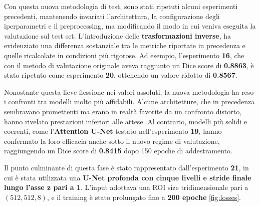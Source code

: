 
Con questa nuova metodologia di test, sono stati ripetuti alcuni esperimenti precedenti, mantenendo invariati l’architettura, la configurazione degli iperparametri e il preprocessing, ma modificando il modo in cui veniva eseguita la valutazione sul test set. L’introduzione delle \textbf{trasformazioni inverse}, ha evidenziato una differenza sostanziale tra le metriche riportate in precedenza e quelle ricalcolate in condizioni più rigorose. Ad esempio, l’esperimento \textbf{16}, che con il metodo di valutazione originale aveva raggiunto un Dice score di \textbf{0.8863}, è stato ripetuto come esperimento \textbf{20}, ottenendo un valore ridotto di \textbf{0.8567}. 

Nonostante questa lieve flessione nei valori assoluti, la nuova metodologia ha reso i confronti tra modelli molto più affidabili. Alcune architetture, che in precedenza sembravano promettenti ma erano in realtà favorite da un confronto distorto, hanno rivelato prestazioni inferiori alle attese. Al contrario, modelli più solidi e coerenti, come l’\textbf{Attention U-Net} testato nell’esperimento \textbf{19}, hanno confermato la loro efficacia anche sotto il nuovo regime di valutazione, raggiungendo un Dice score di \textbf{0.8415} dopo 150 epoche di addestramento.

Il punto culminante di questa fase è stato rappresentato dall’esperimento \textbf{21}, in cui è stata utilizzata una \textbf{U-Net profonda con cinque livelli e stride finale lungo l’asse z pari a 1}. L’input adottava una ROI size tridimensionale pari a $(512, 512, 8)$, e il training è stato prolungato fino a \textbf{200 epoche} \ref{fig:losses}. 

